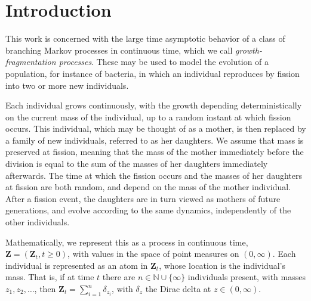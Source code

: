 \documentclass[11pt]{article}
\theoremstyle{definition}
\numberwithin{equation}{section}
\numberwithin{figure}{section}
\numberwithin{table}{section}
\newcommand\Zz{\mathbf{Z}}
\newcommand\NN{\mathbb{N}}
\begin{document}
\section{Introduction}
This work is concerned with the large time asymptotic behavior of a class of branching Markov processes in continuous time, which we call \emph{growth-fragmentation processes}. These may be used to model the evolution of a population, for instance of bacteria, in which an individual reproduces by fission into two or more new individuals.

Each individual grows continuously, with the growth depending deterministically on the current mass of the individual, up to a random instant at which fission occurs. This individual, which may be thought of as a mother, is then replaced by a family of new individuals, referred to as her daughters. We assume that mass is preserved at fission, meaning that the mass of the mother immediately before the division is equal to the sum of the masses of her daughters immediately afterwards. The time at which the fission occurs and the masses of her daughters at fission are both random, and depend on the mass of the mother individual. After a fission event, the daughters are in turn viewed as mothers of future generations, and evolve according to the same dynamics, independently of the other individuals.

Mathematically, we represent this as a process in continuous time, $\Zz=(\Zz_t, t\geq 0)$, with values in the space of point measures on $(0,\infty)$. Each individual is represented as an atom in $\Zz_t$, whose location is the individual's mass. That is, if at time $t$ there are $n\in \NN \cup\{\infty\}$ individuals present, with masses $z_1,z_2,\dotsc$, then $\Zz_t = \sum_{i=1}^n \delta_{z_i}$, with $\delta_z$ the Dirac delta at $z \in (0,\infty)$.
\end{document}
